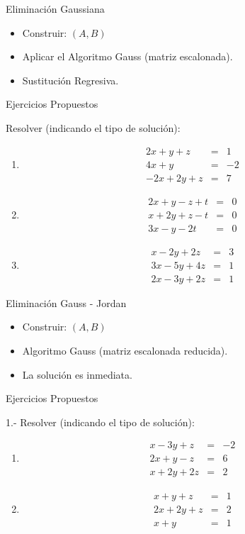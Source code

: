 {Eliminación Gaussiana}
\begin{itemize}
\item
Construir: $(A,B)$
\item
Aplicar el Algoritmo Gauss (matriz escalonada).
\item
Sustitución Regresiva.
\end{itemize}


{Ejercicios Propuestos}

Resolver (indicando el tipo de solución):

\begin{enumerate}
\item
\begin{eqnarray*}
2x  +  y   +  z   &=& 1\\
4x  +  y           &=&  -2\\
-2x + 2y  + z  &=&  7
\end{eqnarray*}


\item
\begin{eqnarray*}
2x  + y   - z   +  t  &=& 0\\
x    +2y   + z -   t  &=&  0\\
3x -  y      -2t        &=&  0
\end{eqnarray*}

\item
\begin{eqnarray*}
x    -  2y   +   2z    &=& 3\\
3x -    5y +   4z    &=&  1\\
2x   -  3y    +2z    &=&  1
\end{eqnarray*}

\end{enumerate}


{Eliminación Gauss - Jordan}
\begin{itemize}
\item
Construir: $(A,B)$
\item
Algoritmo Gauss (matriz escalonada reducida).
\item
La solución es inmediata.
\end{itemize}


{Ejercicios Propuestos}

1.- Resolver (indicando el tipo de solución):

\begin{enumerate}
\item
\begin{eqnarray*}
x- 3y +z  &=& -2\\
2x +y  - z &=&  6\\
x +2y  +2z&=&  2
\end{eqnarray*}

\item
\begin{eqnarray*}
x   + y      +  z  &=& 1\\
2x +  2y  + z   &=&  2\\
x   +  y             &=&  1
\end{eqnarray*}

\end{enumerate}

